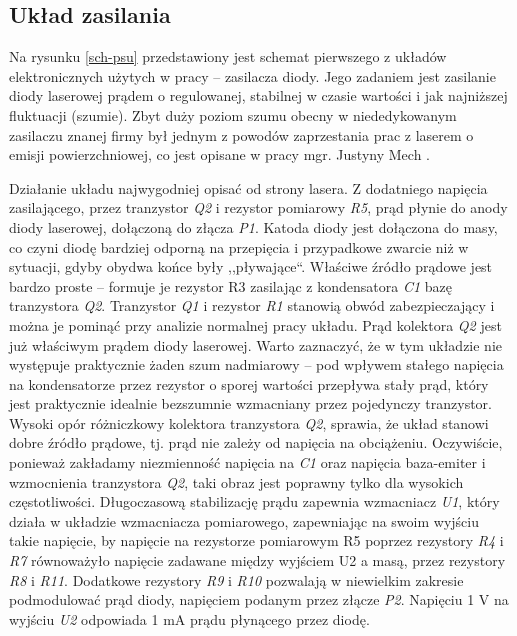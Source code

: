\documentclass[a4paper,10pt]{article}
\begin{document}
\subsection{Układ zasilania}

Na rysunku \ref{sch-psu} przedstawiony jest schemat pierwszego z układów elektronicznych użytych w pracy -- zasilacza diody. Jego zadaniem jest zasilanie diody laserowej prądem o regulowanej, stabilnej w czasie wartości i jak najniższej fluktuacji (szumie). Zbyt duży poziom szumu obecny w niededykowanym zasilaczu znanej firmy był jednym z powodów zaprzestania prac z laserem o emisji powierzchniowej, co jest opisane w pracy mgr. Justyny Mech \cite{mgrJustynaMech}.

Działanie układu najwygodniej opisać od strony lasera. Z dodatniego napięcia zasilającego, przez tranzystor \textit{Q2} i rezystor pomiarowy \textit{R5}, prąd płynie do anody diody laserowej, dołączoną do złącza \textit{P1}. Katoda diody jest dołączona do masy, co czyni diodę bardziej odporną na przepięcia i przypadkowe zwarcie niż w sytuacji, gdyby obydwa końce były ,,pływające``.  
Właściwe źródło prądowe jest bardzo proste -- formuje je rezystor R3 zasilając z kondensatora \textit{C1} bazę tranzystora \textit{Q2}. Tranzystor \textit{Q1} i rezystor \textit{R1} stanowią obwód zabezpieczający i można je pominąć przy analizie normalnej pracy układu. Prąd kolektora \textit{Q2} jest już właściwym prądem diody laserowej. Warto zaznaczyć, że w tym układzie nie występuje praktycznie żaden szum nadmiarowy -- pod wpływem stałego napięcia na kondensatorze przez rezystor o sporej wartości przepływa stały prąd, który jest praktycznie idealnie bezszumnie wzmacniany przez pojedynczy tranzystor. Wysoki opór różniczkowy kolektora tranzystora \textit{Q2}, sprawia, że układ stanowi dobre źródło prądowe, tj. prąd nie zależy od napięcia na obciążeniu. Oczywiście, ponieważ zakładamy niezmienność napięcia na \textit{C1} oraz napięcia baza-emiter i wzmocnienia tranzystora \textit{Q2}, taki obraz jest poprawny tylko dla wysokich częstotliwości. Długoczasową stabilizację prądu zapewnia wzmacniacz \textit{U1}, który działa w układzie wzmacniacza pomiarowego, zapewniając na swoim wyjściu takie napięcie, by napięcie na rezystorze pomiarowym R5 poprzez rezystory \textit{R4} i \textit{R7} równoważyło napięcie zadawane między wyjściem U2 a masą, przez rezystory  \textit{R8} i \textit{R11}.
Dodatkowe rezystory \textit{R9} i \textit{R10} pozwalają w niewielkim zakresie podmodulować prąd diody, napięciem podanym przez złącze \textit{P2}.
Napięciu 1 V na wyjściu \textit{U2} odpowiada 1 mA prądu płynącego przez diodę.
\end{document}
